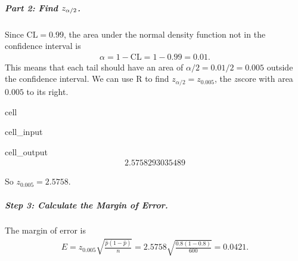 \documentclass[letterpaper,10pt,english]{jupyterBook}
\begin{document}
\subparagraph{Part 2: Find \protect\(z_{\alpha/2}\protect\).}
\label{\detokenize{Ch5 Confidence Intervals/5.2 Estimating Population Proportions:part-2-find-z-alpha-2}}
\sphinxAtStartPar
Since \(\text{CL} = 0.99\), the area under the normal density function not in the confidence interval is
\begin{equation*}
\begin{split}\alpha = 1 - \text{CL} = 1 - 0.99 = 0.01. \end{split}
\end{equation*}
\sphinxAtStartPar
This means that each tail should have an area of \(\alpha/2 = 0.01/2 = 0.005\) outside the confidence interval. We can use R to find \(z_{\alpha/2} = z_{0.005}\), the \(z\)\sphinxhyphen{}score with area \(0.005\) to its right.

\begin{sphinxuseclass}{cell}\begin{sphinxVerbatimInput}

\begin{sphinxuseclass}{cell_input}
\begin{sphinxVerbatim}[commandchars=\\\{\}]
\end{sphinxVerbatim}

\end{sphinxuseclass}\end{sphinxVerbatimInput}
\begin{sphinxVerbatimOutput}

\begin{sphinxuseclass}{cell_output}\begin{equation*}
\begin{split}2.5758293035489\end{split}
\end{equation*}
\end{sphinxuseclass}\end{sphinxVerbatimOutput}

\end{sphinxuseclass}
\sphinxAtStartPar
So \(z_{0.005} = 2.5758\).


\subparagraph{Step 3: Calculate the Margin of Error.}
\label{\detokenize{Ch5 Confidence Intervals/5.2 Estimating Population Proportions:step-3-calculate-the-margin-of-error}}
\sphinxAtStartPar
The margin of error is
\begin{equation*}
\begin{split} E = z_{0.005}\sqrt{\frac{\hat{p}(1 - \hat{p})}{n}} = 2.5758\sqrt{\frac{0.8(1 - 0.8)}{600}} = 0.0421. \end{split}
\end{equation*}
\end{document}
